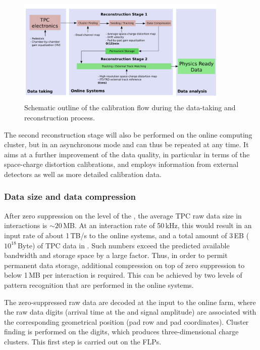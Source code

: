 \begin{figure}[htp]
  \begin{center}
    \includegraphics[width=0.9\textwidth]{TPC/CalibSteps}
    \caption[Schematic outline of the calibration flow]{Schematic
      outline of the calibration flow during the data-taking and
      reconstruction process.}
    \label{fig:calibreco:calib:intro:flow}
  \end{center}
\end{figure}

The second reconstruction stage will also be performed on the online
computing cluster, but in an asynchronous mode and can thus be repeated
at any time.
It aims at a further improvement of the data quality, in particular in
terms of the space-charge distortion calibrations, and employs
information from external detectors as well as more detailed calibration
data.

\subsubsection{Data size and data compression}
\label{sec:calibreco:intro:compression}

After zero suppression on the level of the \fee, the average TPC raw
data size in \minbias \pbpb interactions is $\sim20\,$MB.
At an interaction rate of
50\,kHz, this would result in an input rate of about
1\,TB/s to the online systems, and a total amount
of
3\,EB ($10^{18}$\,Byte) of TPC data in . Such numbers
exceed the predicted available bandwidth and storage space by a large
factor. Thus, in order to permit permanent data storage, additional
compression on top of zero suppression to below 1\,MB per
interaction is required. This can be achieved by two levels of pattern
recognition that are performed in the online systems.

The zero-suppressed raw data are decoded at the input to the online
farm, where the raw data digits (arrival time at the \fee and signal
amplitude) are associated with the corresponding geometrical position
(pad row and pad coordinates). Cluster finding is performed
on the digits, which produces three-dimensional charge clusters.
This first step is carried out on the FLPs.

